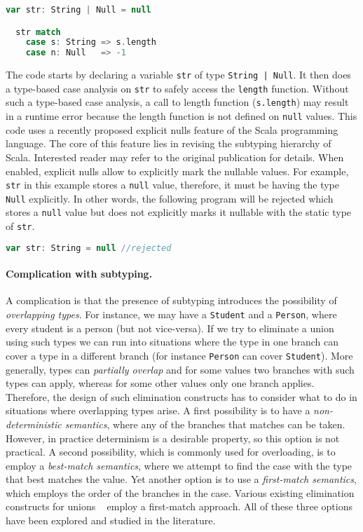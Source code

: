 \begin{lstlisting}[language=Scala]
  var str: String | Null = null

  str match
    case s: String => s.length
    case n: Null   => -1
\end{lstlisting}

The code starts by declaring a variable \lstinline{str}
of type \lstinline{String | Null}. It then does a type-based
case analysis on \lstinline{str} to safely access the
\lstinline{length} function. Without such a type-based case
analysis, a call to length function (\lstinline{s.length})
may result in a runtime error because the length function
is not defined on \lstinline{null} values.
This code uses a recently proposed explicit nulls 
\citep{nieto20nulls} feature
of the Scala programming language. The core of this feature
lies in revising the subtyping hierarchy of Scala.
Interested reader may refer to the original publication for details.
When enabled, explicit nulls allow to explicitly mark
the nullable values. For example, \lstinline{str} in this example
stores a \lstinline{null} value, therefore, it must be having
the type \lstinline{Null} explicitly.
In other words, the following program will be rejected
which stores a \lstinline{null} value but does not explicitly
marks it nullable with the static type of \lstinline{str}.

\begin{lstlisting}[language=Scala]
  var str: String = null //rejected
\end{lstlisting}

\paragraph{Complication with subtyping.}
A complication is that the presence of subtyping introduces the
possibility of \emph{overlapping types}. For instance, we may have a
\lstinline{Student} and a \lstinline{Person}, where every student is a person (but not
vice-versa). If we try to eliminate a union using such types we can
run into situations where the type in one branch can cover a type in a
different branch (for instance \lstinline{Person} can cover
\lstinline{Student}). More generally, types can \emph{partially overlap}
and for some values two branches with such types can apply, whereas
for some other values only one branch applies.
Therefore, the design of such elimination constructs has to
consider what to do in situations where overlapping types arise.  A
first possibility is to have a \emph{non-deterministic semantics},
where any of the branches that matches can be taken. However, in
practice determinism is a desirable property,
so this option is not practical. A second possibility, which is
commonly used for overloading, is to employ a \emph{best-match
  semantics}, where we attempt to find the case with the type that
best matches the value. Yet another option is to use a
\emph{first-match semantics}, which employs the order of the branches
in the case. Various existing elimination constructs for unions
~\citep{benzaken2003cduce,castagna:settheoretic}
employ a first-match approach. All of these three options have been explored
and studied in the literature.

